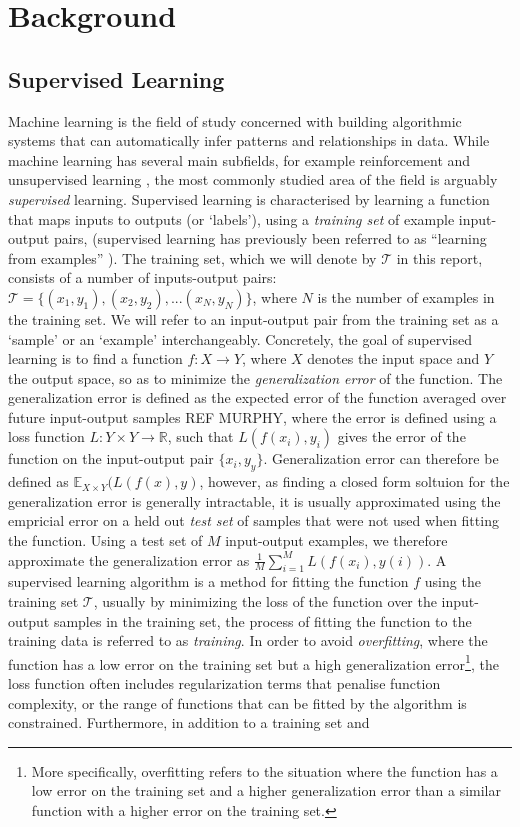 \chapter{Background}

\section{Supervised Learning}
Machine learning is the field of study concerned with building algorithmic systems that can automatically infer patterns and relationships in data. While machine learning has several main subfields, for example reinforcement \cite{sutton1998introduction} and unsupervised learning \cite{hastie2009unsupervised}, the most commonly studied area of the field is arguably \textit{supervised} learning. Supervised learning is characterised by learning a function that maps inputs to outputs (or `labels'), using a \textit{training set} of example input-output pairs, (supervised learning has previously been referred to as ``learning from examples'' \cite{cohn1994improving}). The training set, which we will denote by $\mathcal{T}$ in this report, consists of a number of inputs-output pairs: $\mathcal{T} = \{(x_1,y_1),(x_2,y_2),...(x_N,y_N)\}$, where $N$ is the number of examples in the training set. We will refer to an input-output pair from the training set as a `sample' or an `example' interchangeably. Concretely, the goal of supervised learning is to find a function $f : X \rightarrow Y$, where $X$ denotes the input space and $Y$ the output space, so as to minimize the \textit{generalization error} of the function. The generalization error is defined as the expected error of the function averaged over future input-output samples REF MURPHY, where the error is defined using a loss function $L:Y \times Y \rightarrow \mathbb{R}$, such that $L(f(x_i),y_i)$ gives the error of the function on the input-output pair $\{x_i,y_y\}$. Generalization error can therefore be defined as $\mathbb{E}_{X\times Y}(L(f(x),y)$, however, as finding a closed form soltuion for the generalization error is generally intractable, it is usually approximated using the empricial error on a held out \textit{test set} of samples that were not used when fitting the function. Using a test set of $M$ input-output examples, we therefore approximate the generalization error as $\frac{1}{M}\sum_{i=1}^{M} L(f(x_i),y(i))$. A supervised learning algorithm is a method for fitting the function $f$ using the training set $\mathcal{T}$, usually by minimizing the loss of the function over the input-output samples in the training set, the process of fitting the function to the training data is referred to as \textit{training}. In order to avoid \textit{overfitting}, where the function has a low error on the training set but a high generalization error\footnote{More specifically, overfitting refers to the situation where the function has a low error on the training set and a higher generalization error than a similar function with a higher error on the training set.}, the loss function often includes regularization terms that penalise function complexity, or the range of functions that can be fitted by the algorithm is constrained. Furthermore, in addition to a training set and 